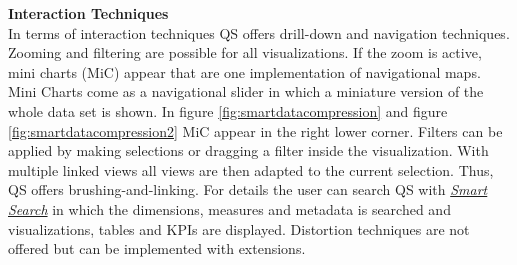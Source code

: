 \textbf{Interaction Techniques}\\
In terms of interaction techniques \gls{QS}   offers drill-down and navigation techniques. Zooming and filtering are possible for all visualizations. If the zoom is active, mini charts  (\gls{MiC}) appear that are one implementation of navigational maps. Mini Charts come as a navigational slider in which a miniature version of the whole data set is shown. In figure \ref{fig:smartdatacompression} and figure \ref{fig:smartdatacompression2} \gls{MiC} appear in the right lower corner.
Filters can be applied by making selections or dragging a filter inside the visualization. With multiple linked views all views are then adapted to the current selection. Thus, \gls{QS}   offers brushing-and-linking. For details the user can search \gls{QS}   with \href{https://help.qlik.com/en-US/sense/2.1/Content/Videos/Videos-global-smart-search.htm}{\textit{Smart Search}} in which the dimensions, measures and metadata is searched and visualizations, tables and KPIs are displayed. Distortion techniques are not offered but can be implemented with extensions. 
\pagebreak
